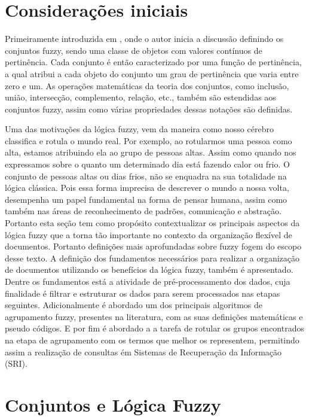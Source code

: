 \section{Considerações iniciais}
Primeiramente introduzida em \cite{Zadeh1965}, onde o autor inicia a discussão definindo os
conjuntos fuzzy, sendo uma classe de objetos com valores contínuos de pertinência. Cada conjunto é
então caracterizado por uma função de pertinência, a qual atribui a cada objeto do conjunto um grau
de pertinência que varia entre zero e um. As operações matemáticas da teoria dos conjuntos, como
inclusão, união, intersecção, complemento, relação, etc., também são estendidas aos conjuntos fuzzy,
assim como várias propriedades dessas notações são definidas.

Uma das motivações da lógica fuzzy, vem da maneira como nosso cérebro classifica e rotula o mundo
real. Por exemplo, ao rotularmos uma pessoa como alta, estamos atribuindo ela ao grupo de pessoas
altas. Assim como quando nos expressamos sobre o quanto um determinado dia está fazendo calor ou
frio. O conjunto de pessoas altas ou dias frios, não se enquadra na sua totalidade na lógica
clássica. Pois essa forma imprecisa de descrever o mundo a nossa volta, desempenha um papel
fundamental na forma de pensar humana, assim como também nas áreas de reconhecimento de padrões,
comunicação e abstração\cite{Zadeh1965}.  Portanto esta seção tem como propósito contextualizar os
principais aspectos da lógica fuzzy que a torna tão importante no contexto da organização flexível
de documentos. Portanto definições mais aprofundadas sobre fuzzy fogem do escopo desse texto.
A definição dos fundamentos necessários para realizar a organização de documentos utilizando os
benefícios da lógica fuzzy, também é apresentado. Dentre os fundamentos está a atividade de
pré-processamento dos dados, cuja finalidade é filtrar e estruturar os dados para serem processados
nas etapas seguintes. Adicionalmente é abordado um dos principais algoritmos de agrupamento fuzzy,
presentes na literatura, com as suas definições matemáticas e pseudo códigos. E por fim é abordado a
a tarefa de rotular os grupos encontrados na etapa de agrupamento com os termos que melhor os
representem, permitindo assim a realização de consultas ém Sistemas de Recuperação da Informação
(SRI).

\section{Conjuntos e Lógica Fuzzy}

